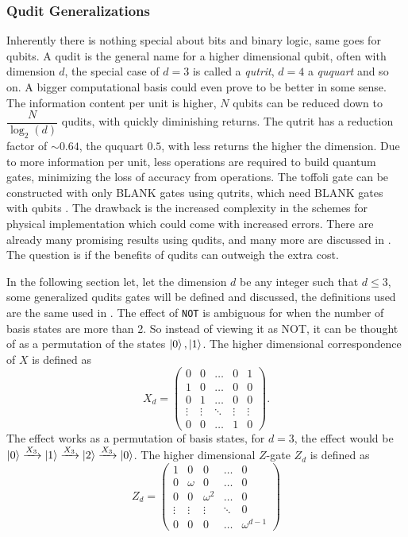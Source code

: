 \subsubsection{Qudit Generalizations}
Inherently there is nothing special about bits and binary logic, same goes for qubits.  A qudit is the general name for a higher dimensional qubit, often with dimension $d$, the special case of $d = 3 
$ is called a \textit{qutrit}, $d = 4$ a \textit{ququart} and so on. A bigger computational basis could even prove to be better in some sense. The information content per unit is higher, $N$ qubits can be reduced down to $\dfrac{N}{\log_2(d)}$ qudits\cite{info_qudit}, with quickly diminishing returns. The qutrit has a reduction factor of $\sim 0.64$, the ququart $0.5$, with less returns the higher the dimension. Due to more information per unit, less operations are required to build quantum gates, minimizing the loss of accuracy from operations. The toffoli gate can be constructed with only BLANK gates using qutrits, which need BLANK gates with qubits . The drawback is the increased complexity in the schemes for physical implementation which could come with increased errors. There are already many promising results using qudits\cite{qutrit1}\cite{qudit2}\cite{qudit3}, and many more are discussed in \cite{qudit}. The question is if the benefits of qudits can outweigh the extra cost.

In the following section let, let the dimension $d$ be any integer such that $d \leq 3$, some generalized qudits gates will be defined and discussed, the definitions used are the same used in \cite{qudit}.
The effect of {\tt NOT} is ambiguous for when the number of basis states are more than 2. So instead of viewing it as NOT, it can be thought of as a permutation of the states $\ket{0},\ket{1}$. The higher dimensional correspondence of $X$ is defined as
\begin{equation}
X_d = \begin{pmatrix}
0 & 0 & \dots & 0 & 1\\
1 & 0 & \dots & 0 & 0\\
0 & 1 & \dots & 0 & 0\\
\vdots & \vdots &\ddots& \vdots&\vdots\\
0 & 0& \dots & 1 & 0
\end{pmatrix}.
\end{equation}
The effect works as a permutation of basis states, for $d = 3$, the effect would be $\ket{0} \xrightarrow{X_3} \ket{1} \xrightarrow{X_3} \ket{2} \xrightarrow{X_3} \ket{0}$.
The higher dimensional $Z$-gate $Z_d$ is defined as 
\begin{equation}
Z_d = \begin{pmatrix}
1 & 0 & 0 & \dots & 0 \\
0 & \omega & 0 &\dots & 0\\
0 & 0 & \omega^2&\dots & 0 \\
\vdots & \vdots&\vdots&\ddots& 0\\
0 & 0& 0&\dots  & \omega^{d-1}
\end{pmatrix}
\end{equation}

